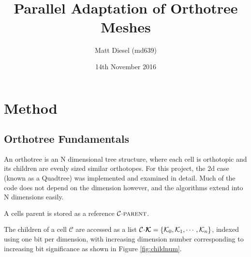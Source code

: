 \documentclass{IIBproject}
\newcommand{\vect} [1] {\bm{#1}}
\newcommand{\acc}{{\mkern 0.5mu\cdot\mkern 0.5mu}}
\numberwithin{figure}{section}
\begin{document}
\date{14th November 2016}
\author{Matt Diesel (md639)}
\title{Parallel Adaptation of Orthotree Meshes}







\section{Method}

\subsection{Orthotree Fundamentals}

An orthotree is an N dimensional tree structure, where each cell is orthotopic \cite{coxeter73} and its children are evenly sized similar orthotopes. For this project, the 2d case (known as a Quadtree) was implemented and examined in detail. Much of the code does not depend on the dimension however, and the algorithms extend into N dimensions easily.

A cells parent is stored as a reference $\mathcal{C}\acc\textproc{parent}$.

The children of a cell $\mathcal{C}$ are accessed as a list $\mathcal{C}\acc\vect{\mathcal{K}}=\{\mathcal{K}_0,\mathcal{K}_1,\cdots,\mathcal{K}_n\}$, indexed using one bit per dimension, with increasing dimension number corresponding to increasing bit significance as shown in Figure \ref{fig:childnum}.
\end{document}
